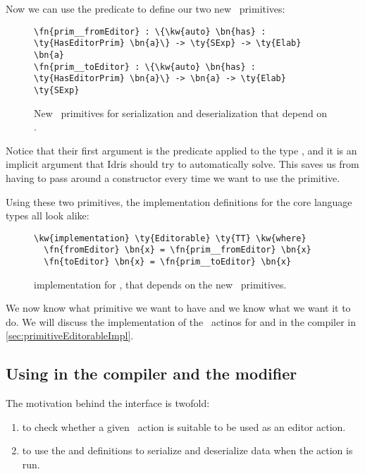 Now we can use the predicate  to define our two new
\Elab\ primitives:

\begin{figure}[ht]
\caption{New \Elab\ primitives for serialization and deserialization that depend on .}
\label{code:newElabPrims}
\begin{Verbatim}[framesep=2mm, label=\footnotesize{\normalfont{Idris}}, labelposition=topline]
\fn{prim__fromEditor} : \{\kw{auto} \bn{has} : \ty{HasEditorPrim} \bn{a}\} -> \ty{SExp} -> \ty{Elab} \bn{a}
\fn{prim__toEditor} : \{\kw{auto} \bn{has} : \ty{HasEditorPrim} \bn{a}\} -> \bn{a} -> \ty{Elab} \ty{SExp}
\end{Verbatim}
\end{figure}

Notice that their first argument is the predicate  applied to
the type , and it is an implicit argument that Idris should try to
automatically solve. This saves us from having to pass around a constructor
every time we want to use the primitive.

Using these two primitives, the  implementation definitions for
the core language types all look alike:

\begin{figure}[ht]
\caption{ implementation for \TT, that depends on the new \Elab\ primitives.}
\begin{Verbatim}[framesep=2mm, label=\footnotesize{\normalfont{Idris}}, labelposition=topline]
\kw{implementation} \ty{Editorable} \ty{TT} \kw{where}
  \fn{fromEditor} \bn{x} = \fn{prim__fromEditor} \bn{x}
  \fn{toEditor} \bn{x} = \fn{prim__toEditor} \bn{x}
\end{Verbatim}
\end{figure}

We now know what primitive we want to have and we know what we want it to do.
We will discuss the implementation of the \Elab\ actinos for 
and  in the compiler in \autoref{sec:primitiveEditorableImpl}.

\subsection{Using  in the compiler and the  modifier}\label{ssec:usingEditorable}

The motivation behind the  interface is twofold:
\begin{enumerate}
\item to check whether a given \Elab\ action is suitable to be used as an
  editor action.
\item to use the  and  definitions to serialize
  and deserialize data when the action is run.
\end{enumerate}

